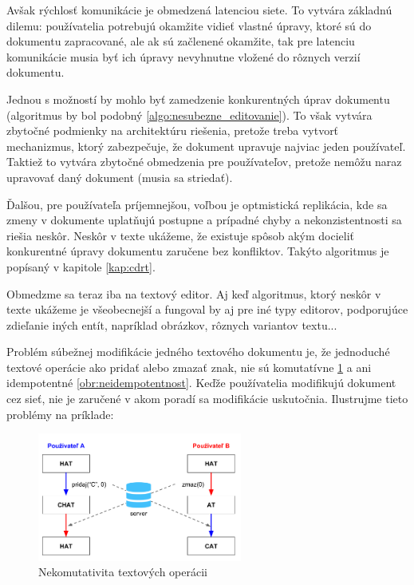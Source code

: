 Avšak rýchlosť komunikácie je obmedzená latenciou siete. To vytvára základnú dilemu: 
používatelia potrebujú okamžite vidieť vlastné úpravy, ktoré sú do dokumentu zapracované,
ale ak sú začlenené okamžite, tak pre latenciu komunikácie musia byť ich
úpravy nevyhnutne vložené do rôznych verzií dokumentu.

Jednou s možností by mohlo byť zamedzenie konkurentných úprav dokumentu (algoritmus by bol podobný
\ref{algo:nesubezne_editovanie}). To však vytvára zbytočné podmienky na architektúru riešenia,
pretože treba vytvorť mechanizmus, ktorý zabezpečuje, že dokument upravuje najviac jeden
používateľ. Taktiež to vytvára zbytočné obmedzenia pre používateľov, pretože nemôžu naraz
upravovať daný dokument (musia sa striedať).

Ďalšou, pre používateľa príjemnejšou, voľbou je optmistická
replikácia, kde sa zmeny v dokumente uplatňujú postupne a prípadné chyby a nekonzistentnosti sa
riešia neskôr. Neskôr v texte ukážeme, že existuje spôsob akým docieliť konkurentné úpravy 
dokumentu zaručene bez konfliktov. Takýto algoritmus je popísaný v kapitole \ref{kap:cdrt}.

Obmedzme sa teraz iba na textový editor. Aj keď algoritmus, ktorý neskôr v texte ukážeme je
všeobecnejší a fungoval by aj pre iné typy editorov, podporujúce zdieľanie iných entít, napríklad
obrázkov, rôznych variantov textu... 

\medskip

Problém súbežnej modifikácie jedného textového dokumentu je, že jednoduché textové operácie ako
pridať alebo zmazať znak, nie sú komutatívne \ref{obr:nekomutativita} a ani 
idempotentné \ref{obr:neidempotentnost}. Keďže používatelia
modifikujú dokument cez sieť, nie je zaručené v akom poradí sa modifikácie uskutočnia. 
Ilustrujme tieto problémy na príklade:

\begin{figure}[H]
\centerline{\includegraphics[width=0.6\textwidth]{images/nekomutativne_operacie}}
\caption[Nekomutativita textových operácii]{Nekomutativita textových operácii}
\label{obr:nekomutativita}
\end{figure}

